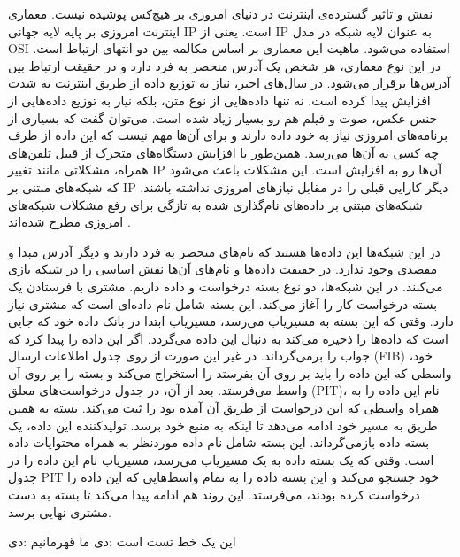 

نقش و تاثیر گسترده‌ی اینترنت در دنیای امروزی بر هیچ‌کس پوشیده نیست. معماری اینترنت امروزی بر پایه لایه جهانی IP است. یعنی از IP به عنوان لایه شبکه در مدل OSI  استفاده می‌شود. ماهیت این معماری بر اساس مکالمه بین دو انتهای ارتباط است. در این نوع معماری، هر شخص یک آدرس منحصر به فرد دارد و در حقیقت ارتباط بین آدرس‌ها برقرار می‌شود. 
در سال‌های اخیر، نیاز به توزیع داده‌ از طریق اینترنت به شدت افزایش پیدا کرده است. نه تنها داده‌هایی از نوع متن، بلکه نیاز به توزیع داده‌هایی از جنس عکس، صوت و فیلم هم رو بسیار زیاد شده است. می‌توان گفت که بسیاری از برنامه‌های امروزی نیاز به خود داده دارند و برای آن‌ها مهم نیست که این داده از طرف چه کسی به آن‌ها می‌رسد. همین‌طور با افزایش دستگاه‌های متحرک از قبیل تلفن‌های همراه، مشکلاتی مانند تغییر IP آن‌ها رو به افزایش است. این مشکلات باعث می‌شود که شبکه‌‌های مبتنی بر IP دیگر کارایی قبلی را در مقابل نیازهای امروزی نداشته باشند. شبکه‌های مبتنی بر داده‌‌های نام‌گذاری شده به تازگی برای رفع مشکلات شبکه‌های امروزی مطرح شده‌اند
\cite{ndn}.

در این شبکه‌ها این داده‌ها هستند که نام‌های منحصر به فرد دارند و دیگر آدرس مبدا و مقصدی وجود ندارد. در حقیقت داده‌ها و نام‌‌های آن‌ها نقش اساسی را در شبکه بازی می‌کنند. در این شبکه‌ها، دو نوع بسته درخواست و داده داریم. مشتری با فرستادن یک بسته درخواست کار را آغاز می‌کند. این بسته شامل نام داده‌ای است که مشتری نیاز دارد. وقتی که این بسته به مسیریاب می‌رسد، مسیریاب ابتدا در بانک داده خود که جایی است که داده‌ها را ذخیره می‌کند به دنبال این داده می‌گردد. اگر این داده را پیدا کرد که جواب را برمی‌گرداند. در غیر این صورت از روی جدول اطلاعات ارسال (FIB) خود، واسطی که این داده را باید بر روی آن بفرستد را استخراج می‌کند و بسته را بر روی آن واسط می‌فرستد. بعد از آن، در جدول درخواست‌های معلق (PIT)، نام این داده را به همراه واسطی که این درخواست از طریق آن آمده بود را ثبت می‌کند. بسته به همین‌ طریق به مسیر خود ادامه می‌دهد تا اینکه به منبع خود برسد. تولیدکننده این داده، یک بسته داده بازمی‌گرداند. این بسته شامل نام داده موردنظر به همراه محتوایات داده است. وقتی که یک بسته داده به یک مسیریاب می‌رسد، مسیریاب نام این داده را در جدول PIT خود جستجو می‌کند و این بسته داده را به تمام واسط‌هایی که این داده را درخواست کرده بودند، می‌فرستد. این روند هم ادامه پیدا می‌کند تا بسته به دست مشتری نهایی برسد. 
 
این یک خط تست است :دی 
ما قهرمانیم :دی 
